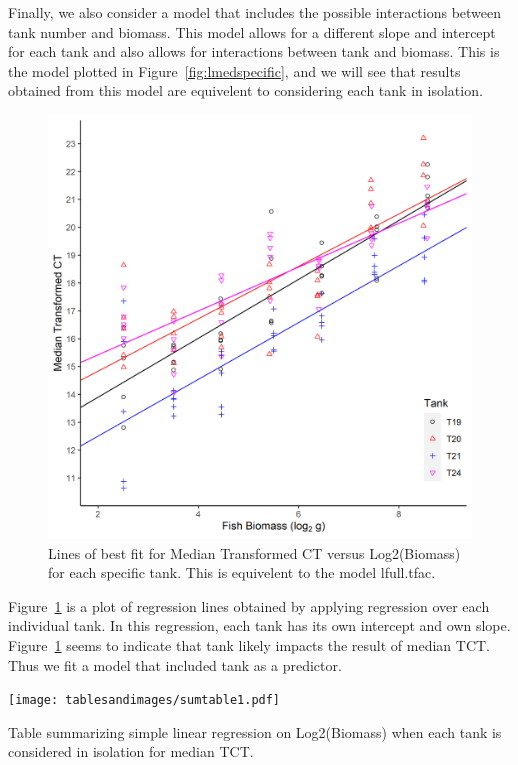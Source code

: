 \newpage

Finally, we also consider a model that includes the possible interactions between tank number and biomass.  This model allows for a different slope and intercept for each tank and also allows for interactions between tank and biomass. This is the model plotted in Figure~\ref{fig:lmedspecific}, and we will see that results obtained from this model are equivelent to considering each tank in isolation.

\begin{figure}[H]
\includegraphics{Chapter3Images/ggplotnew2.png}
\caption{ Lines of best fit for Median Transformed CT versus Log2(Biomass) for each specific tank. This is equivelent to the model lfull.tfac.}
\label{fig:medct33}
\end{figure}

Figure~\ref{fig:medct33} is a plot of regression lines obtained by applying regression over each individual tank. In this regression, each tank has its own intercept and own slope. Figure~\ref{fig:medct33} seems to indicate that tank likely impacts the result of median TCT. Thus we fit a model that included tank as a predictor. 



\begin{table}[H]
\texttt{[image: tablesandimages/sumtable1.pdf]}
\caption{Table summarizing simple linear regression on Log2(Biomass) when each tank is considered in isolation for median TCT.}
\label{fig:lmedspecific}
\end{table}



